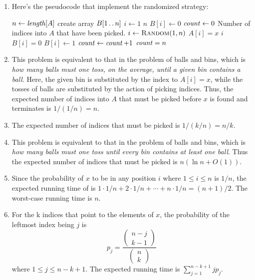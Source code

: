 \documentclass[a4paper, fleqn]{article}
\begin{document}
\begin{enumerate}
\renewcommand{\labelenumi}{\itshape \bfseries \alph{enumi}.}

\item %
Here's the pseudocode that implement the randomized strategy:
\begin{codebox}
\li $n \gets \id{length}[A]$
\li create array $B[1 \mathinner{\ldotp\ldotp} n]$
\li \For $i \gets 1$ \To $n$
\li     \Do
            $B[i] \gets 0$
        \End
\li $\id{count} \gets 0$ \>\>\>\> \Comment Number of indices into $A$ that have been picked.
\li \Repeat
        $i \gets \textnormal{\scshape Random}(1,n)$
\li     \If $A[i] = x$
\li         \Then
                \Return $i$
            \End
\li     \If $B[i] = 0$
\li         \Then
                $B[i] \gets 1$
\li             $\id{count} \gets \id{count} + 1$
            \End
\li \Until $\id{count} = n$
\li \Return {}
\end{codebox}

\item %
This problem is equivalent to that in the problem of balls and bins, which is 
\textit{how many balls must one toss, on the average, until a given bin contains 
a ball}. Here, the given bin is substituted by the index to $A[i] = x$, while 
the tosses of balls are substituted by the action of picking indices. Thus, the 
expected number of indices into $A$ that must be picked before $x$ is found and 
 terminates is $1/(1/n) = n$.

\item %
The expected number of indices that must be picked is $1/(k/n) = n/k$.

\item %
This problem is equivalent to that in the problem of balls and bins, which is 
\textit{how many balls must one toss until every bin contains at least one ball}. 
Thus the expected number of indices that must be picked is $n (\ln n + O(1))$.

\item %
Since the probability of $x$ to be in any position $i$ where $1 \leq i \leq n$ 
is $1/n$, the expected running time of  is $1 \cdot 
1/n + 2 \cdot 1/n + \cdots + n \cdot 1/n = (n + 1)/2$. The worst-case running 
time is $n$.

\item %
For the k indices that point to the elements of $x$, the probability of the 
leftmost index being $j$ is 
\[
p_j = \frac{\left(\!\begin{array}{c}n-j \\ k-1\end{array}\!\right)}{\left(\!\begin{array}{c}n \\ k\end{array}\!\right)}
\]
where $1 \leq j \leq n - k + 1$. The expected running time is $\sum_{j=1}^{n-k+1} j p_j$.


\end{enumerate}
\end{document}
